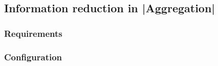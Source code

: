 

\subsection{Information reduction in |Aggregation|}

\subsubsection{Requirements}

\subsubsection{Configuration}
